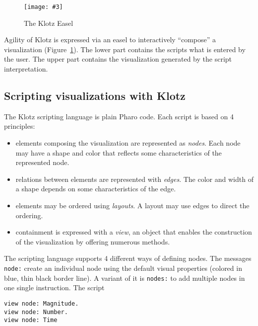 \documentclass{sig-alternate}
\newcommand{\ct}{\lstinline[backgroundcolor=\color{white},basicstyle=\footnotesize\ttfamily]}
\newcommand{\ab}[1]{\nb{Alexandre}{blue}{#1}}
\newcommand{\fig}[4]{
	\begin{figure}[#1]
		\centering
		\texttt{[image: \#3]}
		\caption{\label{fig:#3}#4}
	\end{figure}}
\newcommand{\seclabel}[1]{\label{sec:#1}}
\newcommand{\figref}[1]{Figure~\ref{fig:#1}}
\begin{document}
\fig{h}{0.5}{klotz}{The Klotz Easel}

Agility of Klotz is expressed via an easel to interactively ``compose'' a visualization (\figref{klotz}). The lower part contains the scripts what is entered by the user. The upper part contains the visualization generated by the script interpretation.



\subsection{Scripting visualizations with Klotz} \seclabel{scripting}

The Klotz scripting language is plain Pharo code. Each script is based on 4 principles:

\begin{itemize}
\item elements composing the visualization are represented as \emph{nodes}. Each node may have a shape and color that reflects some characteristics of the represented node.
\item relations between elements are represented with \emph{edges}. The color and width of a shape depends on some characteristics of the edge.
\item elements may be ordered using \emph{layouts}. A layout may use edges to direct the ordering.
\item containment is expressed with a \emph{view}, an object that enables the construction of the visualization by offering numerous methods.%
\end{itemize}


The scripting language supports 4 different ways of defining nodes. 
The messages \ct{node:} create an individual node using the default visual properties (colored in blue, thin black border line). A variant of it is \ct{nodes:} to add multiple nodes in one single instruction. The script 

\begin{lstlisting}
view node: Magnitude.
view node: Number.
view node: Time    
\end{lstlisting}
\end{document}
